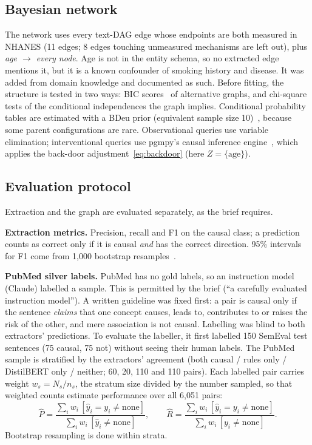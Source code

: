 \documentclass[11pt,a4paper]{article}
\begin{document}
\subsection{Bayesian network}

The network uses every text-DAG edge whose endpoints are both measured in NHANES (11 edges; 8 edges touching unmeasured mechanisms
are left out), plus \emph{age $\rightarrow$ every node}. Age is not in the entity schema, so no extracted edge mentions it, but it is a known
confounder of smoking history and disease. It was added from domain knowledge and documented as such. Before fitting, the structure
is tested in two ways: BIC scores~\citep{schwarz1978} of alternative graphs, and chi-square tests of the conditional independences the
graph implies. Conditional probability tables are estimated with a BDeu prior (equivalent sample size 10)~\citep{heckerman1995}, because
some parent configurations are rare. Observational queries use variable elimination; interventional queries use pgmpy's causal
inference engine~\citep{ankan2015}, which applies the back-door adjustment~\eqref{eq:backdoor} (here $Z=\{\text{age}\}$).

\subsection{Evaluation protocol}

Extraction and the graph are evaluated separately, as the brief requires.

\textbf{Extraction metrics.} Precision, recall and F1 on the causal class; a prediction counts as correct only if it is causal
\emph{and} has the correct direction. 95\% intervals for F1 come from 1{,}000 bootstrap resamples~\citep{efron1979}.

\textbf{PubMed silver labels.} PubMed has no gold labels, so an instruction model (Claude) labelled a sample. This is permitted by the
brief (``a carefully evaluated instruction model''). A written guideline was fixed first: a pair is causal only if the sentence
\emph{claims} that one concept causes, leads to, contributes to or raises the risk of the other, and mere association is not causal. Labelling
was blind to both extractors' predictions. To evaluate the labeller, it first labelled 150 SemEval test sentences (75 causal, 75 not)
without seeing their human labels. The PubMed sample is stratified by the extractors' agreement (both causal / rules only / DistilBERT
only / neither; 60, 20, 110 and 110 pairs). Each labelled pair carries weight $w_s = N_s / n_s$, the stratum size divided by the number
sampled, so that weighted counts estimate performance over all 6{,}051 pairs:
\begin{equation}
  \widehat{P} = \frac{\sum_i w_i\,[\hat y_i = y_i \neq \text{none}]}{\sum_i w_i\,[\hat y_i \neq \text{none}]},\qquad
  \widehat{R} = \frac{\sum_i w_i\,[\hat y_i = y_i \neq \text{none}]}{\sum_i w_i\,[y_i \neq \text{none}]}.
\end{equation}
Bootstrap resampling is done within strata.
\end{document}
